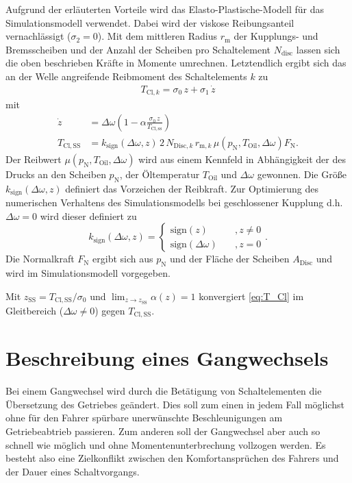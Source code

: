 Aufgrund der erläuterten Vorteile wird das Elasto-Plastische-Modell für das Simulationsmodell verwendet. Dabei wird der viskose Reibungsanteil vernachlässigt ($\sigma_2 = 0$). Mit dem mittleren Radius $r_\mathrm{m}$ der Kupplungs- und Bremsscheiben und der Anzahl der Scheiben pro Schaltelement $N_\mathrm{disc}$  lassen sich die oben beschrieben Kräfte in Momente umrechnen. Letztendlich ergibt sich das an der Welle angreifende Reibmoment des Schaltelements $k$ zu
\begin{align}\label{eq:T_Cl}
T_{\mathrm{Cl},k} = \sigma_0\,z + \sigma_1\,\dot{z}
\end{align}
mit
\begin{align}
\dot{z} &= \Delta \omega \left(1-\alpha\frac{\sigma_0\,z}{T_\mathrm{Cl,ss}}\right)\\
T_\mathrm{Cl,SS} &= k_\mathrm{sign}(\Delta \omega,z)\,2\,N_{\mathrm{Disc},k}\,r_{\mathrm{m},k}\,\mu(p_\mathrm{N},T_\mathrm{Oil},\Delta \omega)F_\mathrm{N}.\label{eq:T_ClSS}
\end{align}
Der Reibwert $\mu(p_\mathrm{N},T_\mathrm{Oil},\Delta \omega)$ wird aus einem Kennfeld in Abhängigkeit der des Drucks an den Scheiben $p_\mathrm{N}$, der Öltemperatur $T_\mathrm{Oil}$ und $\Delta \omega$ gewonnen. Die Größe $k_\mathrm{sign}(\Delta \omega,z)$ definiert das Vorzeichen der Reibkraft. Zur Optimierung des numerischen Verhaltens des Simulationsmodells bei geschlossener Kupplung d.h. $\Delta \omega = 0$ wird dieser definiert zu 
\begin{equation}
k_\mathrm{sign}(\Delta \omega,z)=\begin{cases} \mathrm{sign}(z)\quad &,z\neq 0\\\mathrm{sign}(\Delta \omega)\quad &,z = 0\end{cases}.
\end{equation}
Die Normalkraft $F_\mathrm{N}$ ergibt sich aus $p_\mathrm{N}$ und der Fläche der Scheiben $A_\mathrm{Disc}$ und wird im Simulationsmodell vorgegeben. 

Mit $z_\mathrm{SS} = T_\mathrm{Cl,SS}/\sigma_0$ und $\lim_{z \rightarrow z_\mathrm{SS}}\alpha(z)=1$ konvergiert \eqref{eq:T_Cl} im Gleitbereich ($\Delta \omega \neq 0$) gegen $T_\mathrm{Cl,SS}$. 

\section{Beschreibung eines Gangwechsels}\label{sec:Gangwechsel}
Bei einem Gangwechsel wird durch die Betätigung von Schaltelementen die Übersetzung des Getriebes geändert. Dies soll zum einen in jedem Fall möglichst ohne für den Fahrer spürbare unerwünschte Beschleunigungen am Getriebeabtrieb passieren. Zum anderen soll der Gangwechsel aber auch so schnell wie möglich und ohne Momentenunterbrechung vollzogen werden. Es besteht also eine Zielkonflikt zwischen den Komfortansprüchen des Fahrers und der Dauer eines Schaltvorgangs. 

